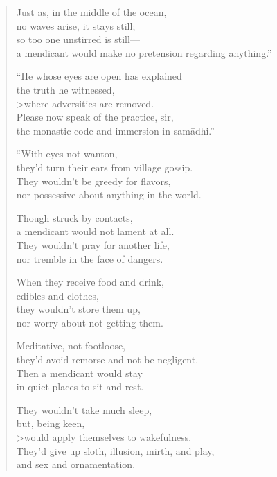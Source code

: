 \documentclass[12pt,openany]{book}%
\begin{document}
\begin{verse}
Just as, in the middle of the ocean, \\
no waves arise, it stays still; \\
so too one unstirred is still—\\
a mendicant would make no pretension regarding anything.” 

“He whose eyes are open has explained \\
the truth he witnessed, \\>where adversities are removed. \\
Please now speak of the practice, sir, \\
the monastic code and immersion in \textsanskrit{samādhi}.” 

“With eyes not wanton, \\
they’d turn their ears from village gossip. \\
They wouldn’t be greedy for flavors, \\
nor possessive about anything in the world. 

Though struck by contacts, \\
a mendicant would not lament at all. \\
They wouldn’t pray for another life, \\
nor tremble in the face of dangers. 

When they receive food and drink, \\
edibles and clothes, \\
they wouldn’t store them up, \\
nor worry about not getting them. 

Meditative, not footloose, \\
they’d avoid remorse and not be negligent. \\
Then a mendicant would stay \\
in quiet places to sit and rest. 

They wouldn’t take much sleep, \\
but, being keen, \\>would apply themselves to wakefulness. \\
They’d give up sloth, illusion, mirth, and play, \\
and sex and ornamentation. 


\end{verse}
\end{document}
